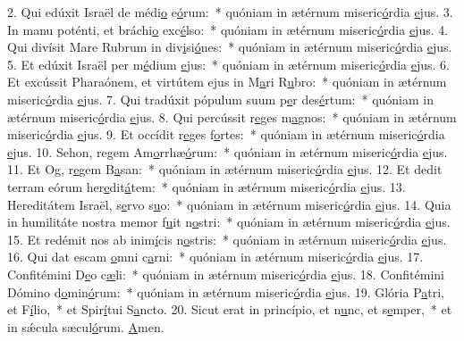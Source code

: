 2. Qui edúxit Israël de médi\uline{o} e\uline{ó}rum:~* quóniam in ætérnum miseric\uline{ó}rdia \uline{e}jus.
3. In manu poténti, et bráchi\uline{o} exc\uline{é}lso:~* quóniam in ætérnum miseric\uline{ó}rdia \uline{e}jus.
4. Qui divísit Mare Rubrum in div\uline{i}si\uline{ó}nes:~* quóniam in ætérnum miseric\uline{ó}rdia \uline{e}jus.
5. Et edúxit Israël per m\uline{é}dium \uline{e}jus:~* quóniam in ætérnum miseric\uline{ó}rdia \uline{e}jus.
6. Et excússit Pharaónem, et virtútem ejus in M\uline{a}ri R\uline{u}bro:~* quóniam in ætérnum miseric\uline{ó}rdia \uline{e}jus.
7. Qui tradúxit pópulum suum p\uline{e}r des\uline{é}rtum:~* quóniam in ætérnum miseric\uline{ó}rdia \uline{e}jus.
8. Qui percússit r\uline{e}ges m\uline{a}gnos:~* quóniam in ætérnum miseric\uline{ó}rdia \uline{e}jus.
9. Et occídit r\uline{e}ges f\uline{o}rtes:~* quóniam in ætérnum miseric\uline{ó}rdia \uline{e}jus.
10. Sehon, regem Am\uline{o}rrhæ\uline{ó}rum:~* quóniam in ætérnum miseric\uline{ó}rdia \uline{e}jus.
11. Et Og, r\uline{e}gem B\uline{a}san:~* quóniam in ætérnum miseric\uline{ó}rdia \uline{e}jus.
12. Et dedit terram eórum her\uline{e}dit\uline{á}tem:~* quóniam in ætérnum miseric\uline{ó}rdia \uline{e}jus.
13. Hereditátem Israël, s\uline{e}rvo s\uline{u}o:~* quóniam in ætérnum miseric\uline{ó}rdia \uline{e}jus.
14. Quia in humilitáte nostra memor f\uline{u}it n\uline{o}stri:~* quóniam in ætérnum miseric\uline{ó}rdia \uline{e}jus.
15. Et redémit nos ab inim\uline{í}cis n\uline{o}stris:~* quóniam in ætérnum miseric\uline{ó}rdia \uline{e}jus.
16. Qui dat escam \uline{o}mni c\uline{a}rni:~* quóniam in ætérnum miseric\uline{ó}rdia \uline{e}jus.
17. Confitémini D\uline{e}o c\uline{æ}li:~* quóniam in ætérnum miseric\uline{ó}rdia \uline{e}jus.
18. Confitémini Dómino d\uline{o}min\uline{ó}rum:~* quóniam in ætérnum miseric\uline{ó}rdia \uline{e}jus.
19. Glória P\uline{a}tri, et F\uline{í}lio,~* et Spir\uline{í}tui S\uline{a}ncto.
20. Sicut erat in princípio, et n\uline{u}nc, et s\uline{e}mper,~* et in sǽcula sæcul\uline{ó}rum. \uline{A}men.
